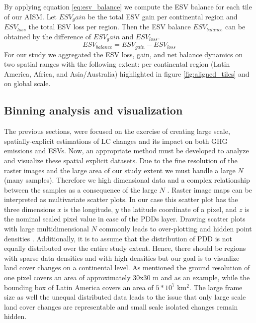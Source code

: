 		By applying equation \ref{eq:esv_balance} we compute the \ac{ESV} balance for each tile of our \ac{AISM}. Let $ESV_gain$ be the total \ac{ESV} gain per continental region and $ESV_{loss}$ the total \ac{ESV} loss per region. Then the \ac{ESV} balance $ESV_{balance}$ can be obtained by the difference of $ESV_gain$ and $ESV_{loss}$.
		\begin{equation}
		\label{eq:esv_balance}
			ESV_{balance} = ESV_{gain} - ESV_{loss}
		\end{equation}
		For our study we aggregated the \ac{ESV} loss, gain, and net balance dynamics on two spatial ranges with the following extent: per continental region (Latin America, Africa, and Asia/Australia) highlighted in figure \ref{fig:aligned_tiles} and on global scale.

	\subsection{Binning analysis and visualization}
	\label{subsec:methods_binning}
		The previous sections, were focused on the exercise of creating large scale, spatially-explicit estimations of \ac{LC} changes and its impact on both \ac{GHG} emissions and \acp{ESV}. Now, an appropriate method must be developed to analyze and visualize these spatial explicit datasets. Due to the fine resolution of the raster images and the large area of our study extent we must handle a large $N$ (many samples). Therefore we high dimensional data and a complex relationship between the samples as a consequence of the large $N$ \citep{Carr1990}. Raster image maps can be interpreted as multivariate scatter plots. In our case this scatter plot has the three dimensions $x$ is the longitude, $y$ the latitude coordinate of a pixel, and $z$ is the nominal scaled pixel value in case of the \acp{PDD} layer. Drawing scatter plots with large multidimensional $N$ commonly leads to over-plotting and hidden point densities \citep{Carr1987}. Additionally, it is to assume that the distribution of \ac{PDD} is not equally distributed over the entire study extent. Hence, there should be regions with sparse data densities and with high densities but our goal is to visualize land cover changes on a continental level. As mentioned the ground resolution of one pixel covers an area of approximately 30x30 m and as an example, while the bounding box of Latin America covers an area of $5*10^7$ km$^2$. The large frame size as well the unequal distributed data leads to the issue that only large scale land cover changes are representable and small scale isolated changes remain hidden.

